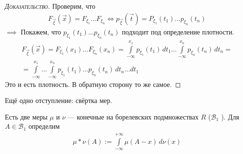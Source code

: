 \begin{proof}[\normalfont\textsc{Доказательство}]
 Проверим, что
 \begin{align*}
  F_{\vec\xi}(\vec x) = F_{\xi_1} \ldots F_{\xi_n} \iff p_{\vec\xi}(\vec t) = P_{\xi_1}(t_1) \ldots p_{\xi_n}(t_n)
 \end{align*}
 $ \implies $ Покажем, что $ p_{\xi_1}(t_1) \ldots p_{\xi_n}(t_n) $ подходит под определение плотности.
 \begin{align*}
  F_{\vec\xi}(\vec x) = F_{\xi_1}(x_1) \ldots F_{\xi_n}(x_n) = \int\limits_{-\infty}^{x_1} p_{\xi_1}(t_1)\,dt_1 \ldots \int\limits_{-\infty}^{x_n} p_{\xi_n}(t_n)\,dt_n = \\
  = \int\limits_{-\infty}^{x_1} \ldots \int\limits_{-\infty}^{x_n} p_{\xi_1}(t_1) \ldots p_{\xi_n}(t_n)\,dt_n\ldots dt_1
 \end{align*} Это и есть плотность. В обратную сторону то же самое.
\end{proof}

Ещё одно отступление: свёртка мер.

Есть две меры $ \mu $ и $ \nu $ --- конечные на борелевских подмножествах $ R $ ($ \mathcal B_1 $ ). Для $ A \in \mathcal B_1 $ определим
 \begin{align*}
 \mu \ast \nu(A) := \int\limits_{-\infty}^{+\infty} \mu(A-x)\,d\nu(x)
\end{align*}

